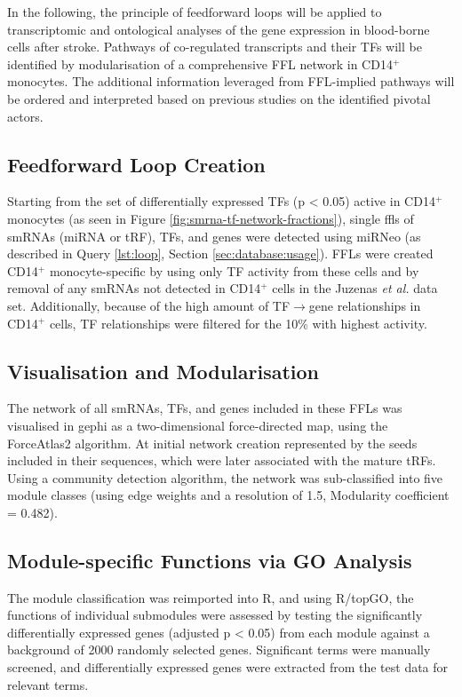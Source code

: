 In the following, the principle of feedforward loops will be applied to transcriptomic and ontological analyses of the gene expression in blood-borne cells after stroke. Pathways of co-regulated transcripts and their TFs will be identified by modularisation of a comprehensive FFL network in CD14$^+$ monocytes. The additional information leveraged from FFL-implied pathways will be ordered and interpreted based on previous studies on the identified pivotal actors.

\begin{method}

\subsection{Feedforward Loop Creation}
Starting from the set of differentially expressed TFs (p < 0.05) active in CD14$^+$ monocytes (as seen in Figure \ref{fig:smrna-tf-network-fractions}), single \acfp{ffl} of smRNAs (miRNA or tRF), TFs, and genes were detected using miRNeo (as described in Query \ref{lst:loop}, Section \ref{sec:database:usage}). FFLs were created CD14$^+$ monocyte-specific by using only TF activity from these cells and by removal of any smRNAs not detected in CD14$^+$ cells in the Juzenas \emph{et al.}\cite{Juzenas2017} data set. Additionally, because of the high amount of TF$\to$gene relationships in CD14$^+$ cells, TF relationships were filtered for the 10\% with highest activity.

\subsection{Visualisation and Modularisation}
The network of all smRNAs, TFs, and genes included in these FFLs was visualised in gephi\cite{Jacomy2014} as a two-dimensional force-directed map, using the ForceAtlas2 algorithm. At initial network creation represented by the seeds included in their sequences, which were later associated with the mature tRFs. Using a community detection algorithm\cite{Blondel2008}, the network was sub-classified into five module classes (using edge weights and a resolution of 1.5, Modularity coefficient = 0.482).

\subsection{Module-specific Functions via GO Analysis}
 The module classification was reimported into R, and using R/topGO,\cite{Alexa2006} the functions of individual submodules were assessed by testing the significantly differentially expressed genes (adjusted p < 0.05) from each module against a background of 2000 randomly selected genes. Significant terms were manually screened, and differentially expressed genes were extracted from the test data for relevant terms.

\end{method}

